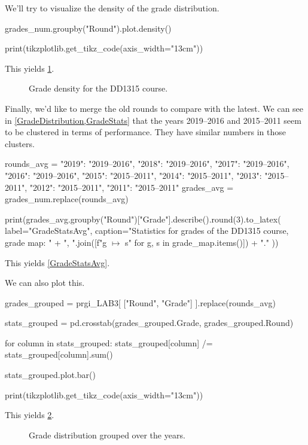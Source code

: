 \stdoutpythontex

We'll try to visualize the density of the grade distribution.
\begin{pyblock}[statstest][numbers=left,firstnumber=last]
grades_num.groupby("Round").plot.density()

print(tikzplotlib.get_tikz_code(axis_width="13cm"))
\end{pyblock}
This yields \cref{GradeDensityFig}.

\begin{figure}
  \centering
  \stdoutpythontex
  \caption{Grade density for the DD1315 course.}
  \label{GradeDensityFig}
\end{figure}

Finally, we'd like to merge the old rounds to compare with the latest.
We can see in \cref{GradeDistribution,GradeStats} that the years 2019--2016 and 
2015--2011 seem to be clustered in terms of performance.
They have similar numbers in those clusters.
\begin{pyblock}[statstest][numbers=left,firstnumber=last]
rounds_avg = {
  "2019": "2019--2016",
  "2018": "2019--2016",
  "2017": "2019--2016",
  "2016": "2019--2016",
  "2015": "2015--2011",
  "2014": "2015--2011",
  "2013": "2015--2011",
  "2012": "2015--2011",
  "2011": "2015--2011"
}
grades_avg = grades_num.replace(rounds_avg)

print(grades_avg.groupby("Round")["Grade"].describe().round(3).to_latex(
  label="GradeStatsAvg",
  caption="Statistics for grades of the DD1315 course, grade map: " +
    ", ".join([f"{g} $\mapsto$ {s}" for g, s in grade_map.items()]) + "."
))
\end{pyblock}
This yields \cref{GradeStatsAvg}.

\stdoutpythontex

We can also plot this.
\begin{pyblock}[statstest][numbers=left,firstnumber=last]
grades_grouped = prgi_LAB3[ ["Round", "Grade"] ].replace(rounds_avg)

stats_grouped = pd.crosstab(grades_grouped.Grade, grades_grouped.Round)

for column in stats_grouped:
  stats_grouped[column] /= stats_grouped[column].sum()

stats_grouped.plot.bar()

print(tikzplotlib.get_tikz_code(axis_width="13cm"))
\end{pyblock}
This yields \cref{GradeDistGroupedFig}.

\begin{figure}
  \centering
  \stdoutpythontex
  \caption{Grade distribution grouped over the years.}
  \label{GradeDistGroupedFig}
\end{figure}



